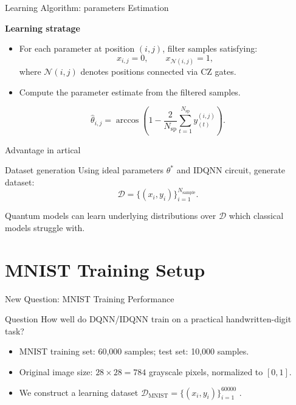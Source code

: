 \documentclass[aspectratio=169]{beamer}
\begin{document}
\begin{frame}{Learning Algorithm: parameters Estimation}
  \small
 
  {\bfseries Learning stratage}
  \begin{itemize}
    \item For each parameter at position $(i,j)$, filter samples satisfying:
    \[
      x_{i,j}=0,\qquad x_{\mathcal N(i,j)}=1,
    \]
    where $\mathcal N(i,j)$ denotes positions connected via CZ gates.
    \item Compute the parameter estimate from the filtered samples.
  \end{itemize}

  \[
    \hat\theta_{i,j}=\arccos\!\left(1-\frac{2}{N_{\mathrm{sp}}}\sum_{t=1}^{N_{\mathrm{sp}}}y^{(i,j)}_{(t)}\right).
  \]

\end{frame}

\begin{frame}{Advantage in artical}
  \begin{block}{Dataset generation}
    Using ideal parameters $\theta^*$ and IDQNN circuit, generate dataset:
    \[
      \mathcal{D} = \{(x_i, y_i)\}_{i=1}^{N_{\mathrm{sample}}}.
    \]
  \end{block}
  \vspace{1.35em}
  Quantum models can learn underlying distributions over $\mathcal{D}$ which classical models struggle with.
\end{frame}



\section{MNIST Training Setup}

\begin{frame}{New Question: MNIST Training Performance}
  \begin{block}{Question}
    How well do DQNN/IDQNN train on a practical handwritten-digit task?
  \end{block}
  \vspace{1.8em}
  \begin{itemize}
    \setlength{\itemsep}{6pt}
    \item MNIST training set: 60,000 samples; test set: 10,000 samples.
    \item Original image size: $28\times28=784$ grayscale pixels, normalized to $[0,1]$.
    \item We construct a learning dataset $\mathcal D_{\mathrm{MNIST}}=\{(x_i,y_i)\}_{i=1}^{60000}$ .
  \end{itemize}

\end{frame}
\end{document}
